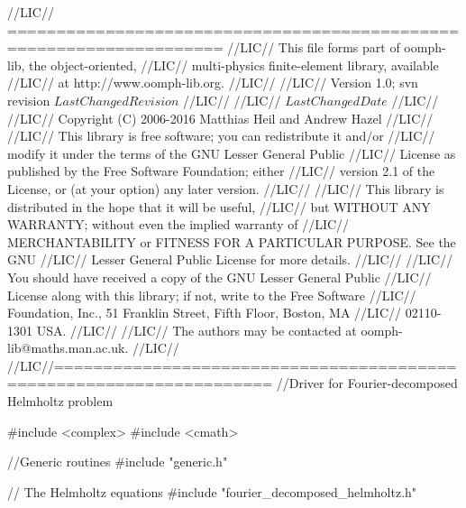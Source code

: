 \begin{DoxyCodeInclude}
\textcolor{comment}{//LIC// ====================================================================}
\textcolor{comment}{//LIC// This file forms part of oomph-lib, the object-oriented, }
\textcolor{comment}{//LIC// multi-physics finite-element library, available }
\textcolor{comment}{//LIC// at http://www.oomph-lib.org.}
\textcolor{comment}{//LIC// }
\textcolor{comment}{//LIC//    Version 1.0; svn revision $LastChangedRevision$}
\textcolor{comment}{//LIC//}
\textcolor{comment}{//LIC// $LastChangedDate$}
\textcolor{comment}{//LIC// }
\textcolor{comment}{//LIC// Copyright (C) 2006-2016 Matthias Heil and Andrew Hazel}
\textcolor{comment}{//LIC// }
\textcolor{comment}{//LIC// This library is free software; you can redistribute it and/or}
\textcolor{comment}{//LIC// modify it under the terms of the GNU Lesser General Public}
\textcolor{comment}{//LIC// License as published by the Free Software Foundation; either}
\textcolor{comment}{//LIC// version 2.1 of the License, or (at your option) any later version.}
\textcolor{comment}{//LIC// }
\textcolor{comment}{//LIC// This library is distributed in the hope that it will be useful,}
\textcolor{comment}{//LIC// but WITHOUT ANY WARRANTY; without even the implied warranty of}
\textcolor{comment}{//LIC// MERCHANTABILITY or FITNESS FOR A PARTICULAR PURPOSE.  See the GNU}
\textcolor{comment}{//LIC// Lesser General Public License for more details.}
\textcolor{comment}{//LIC// }
\textcolor{comment}{//LIC// You should have received a copy of the GNU Lesser General Public}
\textcolor{comment}{//LIC// License along with this library; if not, write to the Free Software}
\textcolor{comment}{//LIC// Foundation, Inc., 51 Franklin Street, Fifth Floor, Boston, MA}
\textcolor{comment}{//LIC// 02110-1301  USA.}
\textcolor{comment}{//LIC// }
\textcolor{comment}{//LIC// The authors may be contacted at oomph-lib@maths.man.ac.uk.}
\textcolor{comment}{//LIC// }
\textcolor{comment}{//LIC//====================================================================}
\textcolor{comment}{//Driver for Fourier-decomposed  Helmholtz problem }

\textcolor{preprocessor}{#include <complex>}
\textcolor{preprocessor}{#include <cmath>}

\textcolor{comment}{//Generic routines}
\textcolor{preprocessor}{#include "generic.h"}

\textcolor{comment}{// The Helmholtz equations}
\textcolor{preprocessor}{#include "fourier\_decomposed\_helmholtz.h"}
 

\end{DoxyCodeInclude}
